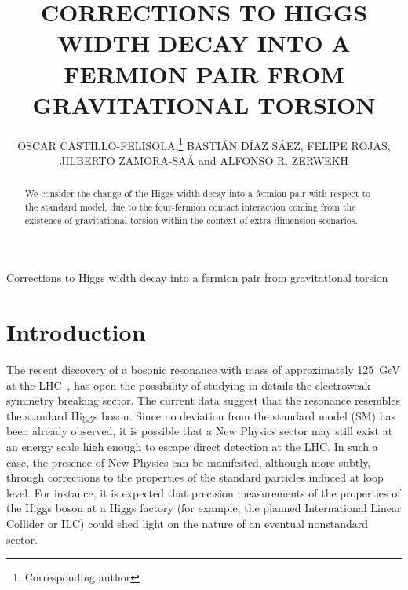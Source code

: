 \documentclass{ws-mpla}
\renewcommand{\(}{\left(}
\renewcommand{\)}{\right)}
\renewcommand{\[}{\left[}
\renewcommand{\]}{\right]}
\newcommand\UTFSM{Departamento de F\'\i sica, Universidad T\'{e}cnica Federico Santa Mar\'\i a, \\ Casilla 110-V, Valpara\'\i so, Chile}
\newcommand\CCTVal{Centro Cient\'\i fico Tecnol\'ogico de Valpara\'\i so, \\ Casilla 110-V, Valpara\'\i so, Chile}
\begin{document}
{Corrections to Higgs width decay into a fermion pair from gravitational torsion}

\catchline{}{}{}{}{}


\title{CORRECTIONS TO HIGGS WIDTH DECAY INTO A FERMION PAIR FROM GRAVITATIONAL TORSION}

\author{OSCAR {CASTILLO-FELISOLA},\footnote{Corresponding author} \quad BASTI\'AN {D\'IAZ S\'AEZ}, \quad  FELIPE {ROJAS}, \\ JILBERTO {ZAMORA-SA\'A} and ALFONSO R. {ZERWEKH}}

\address{\UTFSM, and \\ \CCTVal. \\ o.castillo.felisola@gmail.com}

\maketitle



\begin{abstract}
  We consider the change of the Higgs width decay into a fermion pair  with respect to the standard model, due to the four-fermion contact interaction coming from the existence of gravitational torsion within the context of extra dimension scenarios.
\end{abstract}




\section{Introduction}\label{intro}


The recent discovery of a bosonic resonance with mass of approximately \SI{125}{\GeV} at the LHC~\cite{Aaltonen:2012qt,Aad:2012tfa,Chatrchyan:2012ufa,Aad:2015zhl}, has open the possibility of studying in details the electroweak symmetry breaking sector. The current data suggest that the resonance resembles the standard Higgs boson.   Since no deviation from the standard model (SM) has been already observed, it is possible that a New Physics sector may still exist at an energy scale high enough to escape direct detection at the LHC. In such a case, the presence of New Physics can be manifested, although more subtly, through corrections to the properties of the standard particles induced at loop level. For instance, it is expected that  precision measurements of the properties of the Higgs boson at a Higgs factory (for example, the planned International Linear Collider or ILC) could shed light on the nature of an eventual nonstandard sector.
\end{document}
